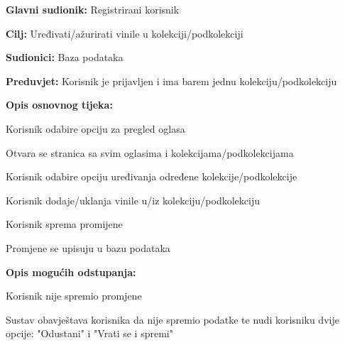 				\noindent {}
					\begin{packed_item}
	
						\item \textbf{Glavni sudionik: }Registrirani korisnik
						\item  \textbf{Cilj:} Uređivati/ažurirati vinile u kolekciji/podkolekciji
						\item  \textbf{Sudionici:} Baza podataka
						\item  \textbf{Preduvjet:} Korisnik je prijavljen i ima barem jednu kolekciju/podkolekciju
						\item  \textbf{Opis osnovnog tijeka:}
						
						\item[] \begin{packed_enum}
	
							\item Korisnik odabire opciju za pregled oglasa
							\item Otvara se stranica sa svim oglasima i kolekcijama/podkolekcijama
							\item Korisnik odabire opciju uređivanja određene kolekcije/podkolekcije
							\item Korisnik dodaje/uklanja vinile u/iz kolekciju/podkolekciju
							\item Korisnik sprema promijene
							\item Promjene se upisuju u bazu podataka

						\end{packed_enum}		
						
						\item  \textbf{Opis mogućih odstupanja:}
						
						\item[] \begin{packed_item}
	
							\item[5.a] Korisnik nije spremio promjene
								\begin{packed_item}
									\item Sustav obavještava korisnika da nije spremio podatke te nudi korisniku dvije opcije: "Odustani" i "Vrati se i spremi"
								\end{packed_item}
								
						\end{packed_item}				
					\end{packed_item}
					
